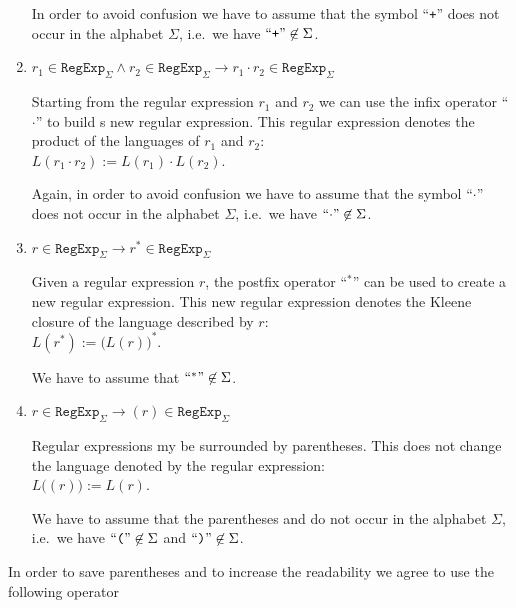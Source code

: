 \begin{Definition}
\begin{enumerate}
        In order to avoid confusion we have to assume that the symbol  ``\texttt{+}'' does not occur
        in the alphabet $\Sigma$, i.e.~we have  $\mbox{``\texttt{+}''} \not\in \Sigma$.
  \item $r_1 \in \texttt{RegExp}_\Sigma \wedge r_2 \in \texttt{RegExp}_\Sigma 
         \rightarrow r_1 \cdot r_2 \in \texttt{RegExp}_\Sigma$

        Starting from the regular expression $r_1$ and $r_2$ we can use the  infix operator
        ``$\cdot$'' to build s new regular expression.  This regular expression denotes
        the product of the languages of $r_1$ and $r_2$:
        \\[0.2cm]
        \hspace*{1.3cm}
        $L(r_1 \cdot r_2) := L(r_1) \cdot L(r_2)$.

        Again, in order to avoid confusion we have to assume that the symbol ``$\cdot$'' does not
        occur in the alphabet $\Sigma$, i.e.~we have $\mbox{``\texttt{$\cdot$}''} \not\in \Sigma$.
  \item $r \in \texttt{RegExp}_\Sigma \rightarrow r^* \in \texttt{RegExp}_\Sigma$

        Given a regular expression $r$, the postfix operator
        ``$^*$'' can be used to create a new regular expression.  This new regular expression
        denotes the Kleene closure of the language described by  $r$:
        \\[0.2cm]
        \hspace*{1.3cm}
        $L(r^*) := \bigl(L(r)\bigr)^*$.

        We have to assume that $\mbox{``\texttt{$^*$}''} \not\in \Sigma$. 
  \item $r \in \texttt{RegExp}_\Sigma \rightarrow (r) \in \texttt{RegExp}_\Sigma$

        Regular expressions my be surrounded by parentheses.  This does not change the language
        denoted by the regular expression:
        \\[0.2cm]
        \hspace*{1.3cm}
        $L\bigl((r)\bigr) := L(r)$. 

        We have to assume that the parentheses  \qote{(} and \qote{)} do not occur
        in the alphabet $\Sigma$, i.e.~we have $\mbox{``\texttt{(}''} \not\in \Sigma$  and $\mbox{``\texttt{)}''} \not\in \Sigma$. \eox
  \end{enumerate}
\end{Definition}
In order to save parentheses and to increase the readability we agree to use the following operator
